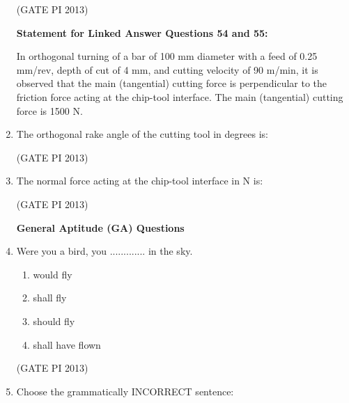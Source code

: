 \documentclass[journal,12pt,onecolumn]{IEEEtran}
\theoremstyle{remark}
\begin{document}
\begin{enumerate}
\hfill (GATE PI 2013)

\textbf{Statement for Linked Answer Questions 54 and 55:}  

In orthogonal turning of a bar of 100 mm diameter with a feed of 0.25 mm/rev, depth of cut of 4 mm, and cutting velocity of 90 m/min, it is observed that the main (tangential) cutting force is perpendicular to the friction force acting at the chip-tool interface. The main (tangential) cutting force is 1500 N. \\

\item The orthogonal rake angle of the cutting tool in degrees is:
\begin{enumerate}
\end{enumerate}

\hfill (GATE PI 2013)

\item The normal force acting at the chip-tool interface in N is:
\begin{enumerate}
\end{enumerate}

\hfill (GATE PI 2013)

\textbf{General Aptitude (GA) Questions} \\

\item Were you a bird, you ............. in the sky.
\begin{enumerate}
\item would fly
\item shall fly
\item should fly
\item shall have flown
\end{enumerate}


\hfill (GATE PI 2013)

\item Choose the grammatically INCORRECT sentence:
\begin{enumerate}
\end{enumerate}


\end{enumerate}
\end{document}

